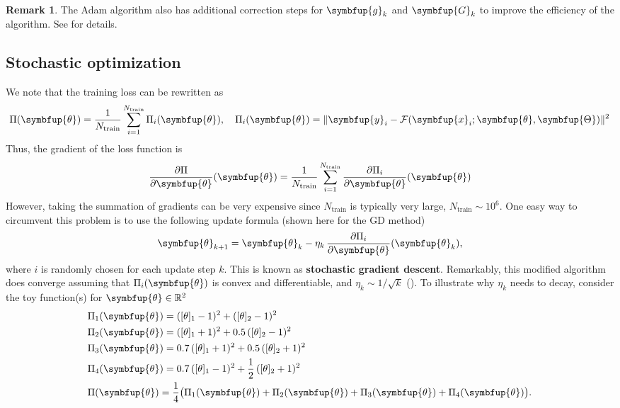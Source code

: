 \documentclass[11pt]{extarticle}
\newcommand{\vx}{\symbfup{x}}
\newcommand{\vy}{\symbfup{y}}
\theoremstyle{definition}
\newcommand{\btheta}{\symbfup{\theta}}
\newcommand{\Hp}{\symbfup{\Theta}}
\newcommand{\g}{\symbfup{g}}
\newcommand{\G}{\symbfup{G}}
\newcommand{\Ro}{\mathbb{R}}           	                %
\newcommand{\df}[2]{\frac{\partial #1}{\partial #2}}
\newtheorem{remark}{Remark}%
\begin{document}
\begin{remark}
The Adam algorithm also has additional correction steps for $\g_k$ and $\G_k$ to improve the efficiency of the algorithm. See \cite{kingma2017adam} for details.
\end{remark}


\subsection*{Stochastic optimization}
We note that the training loss can be rewritten as
\begin{align*}
\Pi(\btheta) = \frac{1}{N_\text{train}} \sum_{i=1}^{N_\text{train}} \Pi_i(\btheta), \quad \Pi_i(\btheta) = \|\vy_i - \mathcal{F}(\vx_i; \btheta, \Hp)\|^2
\end{align*}
Thus, the gradient of the loss function is
\begin{align*}
  \df{\Pi}{\btheta}(\btheta) = \frac{1}{N_\text{train}} \sum_{i=1}^{N_\text{train}}\df{\Pi_i}{\btheta}(\btheta)
\end{align*}
However, taking the summation of gradients can be very expensive since $N_\text{train}$ is typically very large, $N_\text{train} \sim 10^6$. One easy way to circumvent this problem is to use the following update formula (shown here for the GD method)
\begin{equation}\label{eqn:sgd}
  \btheta_{k+1} = \btheta_k - \eta_k\,\df{\Pi_i}{\btheta}(\btheta_k),
\end{equation}
where $i$ is randomly chosen for each update step $k$. This is known as  \textbf{stochastic gradient descent}. Remarkably, this modified algorithm does converge assuming that $\Pi_i(\btheta)$ is convex and differentiable, and $\eta_k \sim 1/\sqrt{k}$ (\cite{nemirovski90}). To illustrate why $\eta_k$ needs to decay, consider the toy function(s) for $\btheta \in \Ro^2$
\begin{equation}
  \begin{aligned}
    &\Pi_1(\btheta) = ([\theta]_1 - 1)^2 + ([\theta]_2 - 1)^2 \\
    &\Pi_2(\btheta) = ([\theta]_1 + 1)^2 + 0.5\,([\theta]_2 - 1)^2\\
    &\Pi_3(\btheta) = 0.7\,([\theta]_1 +1)^2 + 0.5\,([\theta]_2 +1)^2\\
    &\Pi_4(\btheta) = 0.7\,([\theta]_1 - 1)^2 + \frac{1}{2}\,([\theta]_2 + 1)^2\\
    &\Pi(\btheta) = \frac{1}{4} \big(\Pi_1(\btheta) + \Pi_2(\btheta) + \Pi_3(\btheta) + \Pi_4(\btheta)\big).
  \end{aligned}
\end{equation}
\end{document}

